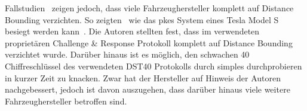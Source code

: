 Fallstudien~\cite{Wouters2019,ADAC2022} zeigen jedoch, dass viele Fahrzeughersteller komplett auf \foreignlanguage{english}{Distance Bounding} verzichten. So zeigten~\citeauthor{Wouters2019} wie das \gls{pkes} System eines Tesla Model S besiegt werden kann~\cite{Wouters2019}. Die Autoren stellten fest, dass im verwendeten proprietären \foreignlanguage{english}{Challenge \& Response} Protokoll komplett auf \foreignlanguage{english}{Distance Bounding} verzichtet wurde. Darüber hinaus ist es möglich, den schwachen \SI{40}{\bit} Chiffreschlüssel des verwendeten DST40 Protokolls durch simples durchprobieren in kurzer Zeit zu knacken. Zwar hat der Hersteller auf Hinweis der Autoren nachgebessert, jedoch ist davon auszugehen, dass darüber hinaus viele weitere Fahrzeughersteller betroffen sind.
